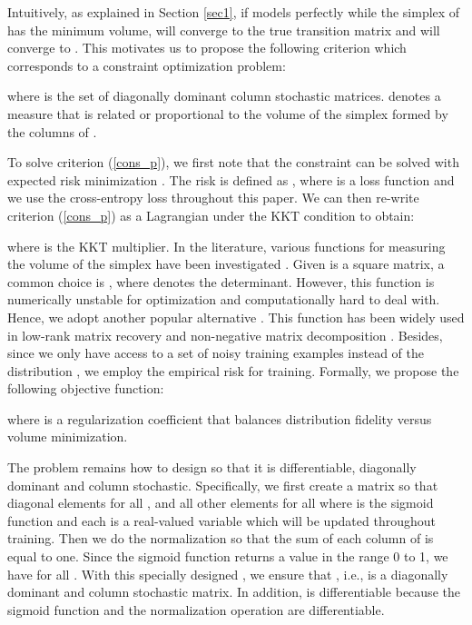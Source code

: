 \documentclass{article}
\begin{document}
Intuitively, as explained in Section \ref{sec1}, if  models  perfectly while the simplex of  has the minimum volume,  will converge to the true transition matrix  and  will converge to . This motivates us to propose the following criterion which corresponds to a constraint optimization problem:




where  is the set of diagonally dominant column stochastic matrices.  denotes a measure that is related or proportional to the volume of the simplex formed by the columns of  .

To solve criterion (\ref{cons_p}), we first note that the constraint  can be solved with expected risk minimization \cite{patrini2017making}. The risk is defined as , where  is a loss function and we use the cross-entropy loss throughout this paper. We can then re-write criterion (\ref{cons_p}) as a Lagrangian under the KKT condition \cite{karush1939minima, kuhn2014nonlinear} to obtain:

where  is the KKT multiplier. In the literature, various functions for measuring the volume of the simplex have been investigated \cite{fu2015blind, li2008minimum, miao2007endmember}. Given  is a square matrix, a common choice is , where  denotes the determinant. However, this function is numerically unstable for optimization and computationally hard to deal with. Hence, we adopt another popular alternative . This function has been widely used in low-rank matrix recovery and non-negative matrix decomposition \cite{fazel2003log, liu2012robust, fu2016robust}. Besides, since we only have access to a set of noisy training examples  instead of the distribution , we employ the empirical risk for training. Formally, we propose the following objective function: 

where  is a regularization coefficient that balances distribution fidelity versus volume minimization. 

The problem remains how to design  so that it is differentiable, diagonally dominant and column stochastic. Specifically, we first create a matrix  so that diagonal elements  for all , and all other elements  for all  where  is the sigmoid function  and each  is a real-valued variable which will be updated throughout training. Then we do the normalization  so that the sum of each column of  is equal to one. Since the sigmoid function returns a value  in the range 0 to 1, we have  for all . With this specially designed , we ensure that , i.e.,  is a diagonally dominant and column stochastic matrix. In addition,  is differentiable because the sigmoid function and the normalization operation are differentiable.
\end{document}
